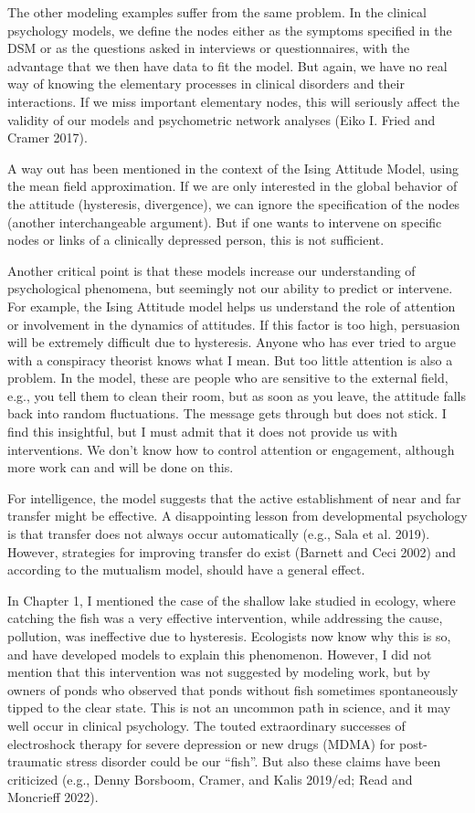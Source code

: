 \documentclass[
  letterpaper,
]{scrbook}
\begin{document}
The other modeling examples suffer from the same problem. In the
clinical psychology models, we define the nodes either as the symptoms
specified in the DSM or as the questions asked in interviews or
questionnaires, with the advantage that we then have data to fit the
model. But again, we have no real way of knowing the elementary
processes in clinical disorders and their interactions. If we miss
important elementary nodes, this will seriously affect the validity of
our models and psychometric network analyses (Eiko I. Fried and Cramer
2017).

A way out has been mentioned in the context of the Ising Attitude Model,
using the mean field approximation. If we are only interested in the
global behavior of the attitude (hysteresis, divergence), we can ignore
the specification of the nodes (another interchangeable argument). But
if one wants to intervene on specific nodes or links of a clinically
depressed person, this is not sufficient.

Another critical point is that these models increase our understanding
of psychological phenomena, but seemingly not our ability to predict or
intervene. For example, the Ising Attitude model helps us understand the
role of attention or involvement in the dynamics of attitudes. If this
factor is too high, persuasion will be extremely difficult due to
hysteresis. Anyone who has ever tried to argue with a conspiracy
theorist knows what I mean. But too little attention is also a problem.
In the model, these are people who are sensitive to the external field,
e.g., you tell them to clean their room, but as soon as you leave, the
attitude falls back into random fluctuations. The message gets through
but does not stick. I find this insightful, but I must admit that it
does not provide us with interventions. We don't know how to control
attention or engagement, although more work can and will be done on
this.

For intelligence, the model suggests that the active establishment of
near and far transfer might be effective. A disappointing lesson from
developmental psychology is that transfer does not always occur
automatically (e.g., Sala et al. 2019). However, strategies for
improving transfer do exist (Barnett and Ceci 2002) and according to the
mutualism model, should have a general effect.

In Chapter 1, I mentioned the case of the shallow lake studied in
ecology, where catching the fish was a very effective intervention,
while addressing the cause, pollution, was ineffective due to
hysteresis. Ecologists now know why this is so, and have developed
models to explain this phenomenon. However, I did not mention that this
intervention was not suggested by modeling work, but by owners of ponds
who observed that ponds without fish sometimes spontaneously tipped to
the clear state. This is not an uncommon path in science, and it may
well occur in clinical psychology. The touted extraordinary successes of
electroshock therapy for severe depression or new drugs (MDMA) for
post-traumatic stress disorder could be our ``fish''. But also these
claims have been criticized (e.g., Denny Borsboom, Cramer, and Kalis
2019/ed; Read and Moncrieff 2022).
\end{document}
